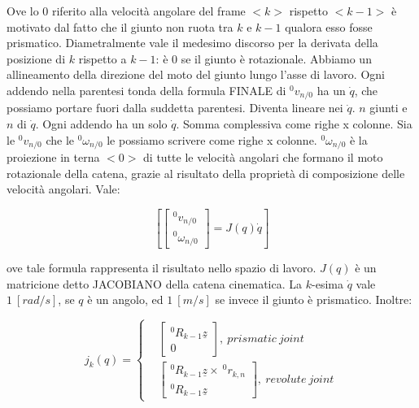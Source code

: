 Ove lo 0 riferito alla velocità angolare del frame $<k>$ rispetto $<k-1>$ è motivato dal fatto che il giunto non ruota tra $k$ e $k-1$ qualora esso fosse prismatico. Diametralmente vale il medesimo discorso per la derivata della posizione di $k$ rispetto a $k-1$: è 0 se il giunto è rotazionale. Abbiamo un allineamento della direzione del moto del giunto lungo l'asse di lavoro. Ogni addendo nella parentesi tonda della formula FINALE di $^0v_{n/0}$ ha un $\dot{q}$, che possiamo portare fuori dalla suddetta parentesi. Diventa lineare nei $\dot{q}$. $n$ giunti e $n$ di $\dot{q}$. Ogni addendo ha un solo $\dot{q}$. Somma complessiva come righe x colonne. Sia le $^0v_{n/0}$ che le $^0\omega_{n/0}$ le possiamo scrivere come righe x colonne. $^0\omega_{n/0}$ è la proiezione in terna $<0>$ di tutte le velocità angolari che formano il moto rotazionale della catena, grazie al risultato della proprietà di composizione delle velocità angolari. Vale:

\[
	[\begin{bmatrix}^0v_{n/0}\\^0\omega_{n/0}\end{bmatrix}=J(q)\dot{q}]
\]

ove tale formula rappresenta il risultato nello spazio di lavoro. $J(q)$ è un matricione detto JACOBIANO della catena cinematica. La $k$-esima $\dot{q}$ vale $1\ [rad/s]$, se $q$ è un angolo, ed $1\ [m/s]$ se invece il giunto è prismatico. Inoltre:

\[
	j_k(q) =
	\left\{
	\begin{aligned}
	&\begin{bmatrix}^0R_{k-1}\underline{z}\\0\end{bmatrix},\ prismatic\ joint\\
	&\begin{bmatrix}^0R_{k-1}\underline{z}\times\ ^0r_{k,n}\\^0R_{k-1}\underline{z}\end{bmatrix},\ revolute\ joint
	\end{aligned}
	\right.
\]

